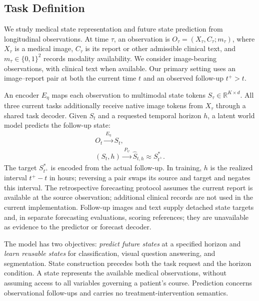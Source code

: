 \subsection{Task Definition}
\label{sec:formulation}

We study medical state representation and future state prediction from longitudinal observations. At time $\tau$, an observation is $O_\tau=(X_\tau,C_\tau;m_\tau)$, where $X_\tau$ is a medical image, $C_\tau$ is its report or other admissible clinical text, and $m_\tau\in\{0,1\}^2$ records modality availability. We consider image-bearing observations, with clinical text when available. Our primary setting uses an image--report pair at both the current time $t$ and an observed follow-up $t^+>t$.

An encoder $E_\eta$ maps each observation to multimodal state tokens $S_\tau\in\mathbb R^{K\times d}$. All three current tasks additionally receive native image tokens from $X_\tau$ through a shared task decoder. Given $S_t$ and a requested temporal horizon $h$, a latent world model predicts the follow-up state:
\begin{equation}
    \begin{gathered}
        O_t \xrightarrow{\ E_\eta\ } S_t,\\
        (S_t,h) \xrightarrow{\ P_\psi\ } \widehat S_{t,h}
        \approx S^*_{t^+}.
    \end{gathered}
    \label{eq:future_prediction}
\end{equation}
The target $S^*_{t^+}$ is encoded from the actual follow-up. In training, $h$ is the realized interval $t^+-t$ in hours; reversing a pair swaps its source and target and negates this interval. The retrospective forecasting protocol assumes the current report is available at the source observation; additional clinical records are not used in the current implementation. Follow-up images and text supply detached state targets and, in separate forecasting evaluations, scoring references; they are unavailable as evidence to the predictor or forecast decoder.

The model has two objectives: \emph{predict future states} at a specified horizon and \emph{learn reusable states} for classification, visual question answering, and segmentation. State construction precedes both the task request and the horizon condition. A state represents the available medical observations, without assuming access to all variables governing a patient's course. Prediction concerns observational follow-ups and carries no treatment-intervention semantics.
